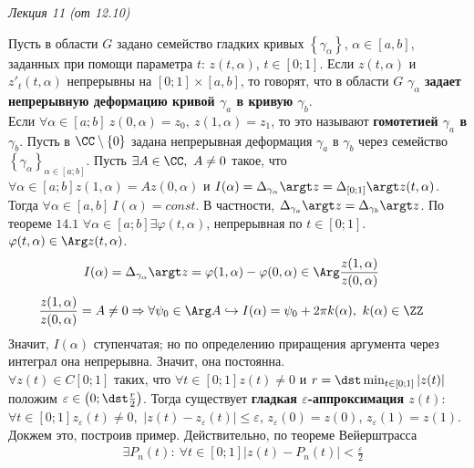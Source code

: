 \begin{flushright}
    \textit{Лекция 11 (от 12.10)}
\end{flushright}
\Def
Пусть в области $G$ задано семейство гладких кривых $\left\{ \gamma_\alpha
\right\}$, $\alpha \in [a,b]$, заданных при помощи параметра $t$: $z(t,
\alpha)$, $t \in [0;1]$. Если $z(t, \alpha)$ и $z'_t(t, \alpha)$ непрерывны на
$[0;1] \times [a,b]$, то говорят, что в области $G$ $\gamma_{\alpha}$
\textbf{задает непрерывную деформацию кривой $\gamma_a$ в кривую $\gamma_b$}.
\\
Если $\forall \alpha \in [a;b] \ z(0, \alpha) = z_0, \ z(1, \alpha) = z_1$, то
это называют \textbf{гомотетией $\gamma_a$ в $\gamma_b$}.
\theorem
Пусть в $\CC \setminus \{0\}$ задана непрерывная деформация $\gamma_a$ в
$\gamma_b$ через семейство $\left\{ \gamma_\alpha \right\}_{\alpha \in [a;b]}$.
Пусть $\exists A \in \CC, \ A \neq 0$ такое, что $\forall \alpha \in [a;b] z(1,
\alpha) = Az(0, \alpha)$ и $I(\alpha) = \Delta_{\gamma_\alpha}\argt z =
\Delta_{[0;1]}\argt z(t, \alpha)$. Тогда $\forall \alpha \in [a,b] \ I(\alpha) =
const$. В частности, $\Delta_{\gamma_a}\argt z = \Delta_{\gamma_b}\argt z$.
\pr
По теореме $14.1$ $\forall \alpha \in [a;b] \exists \varphi(t, \alpha)$,
непрерывная по $t \in [0;1]$. $\varphi(t, \alpha) \in \Arg z (t, \alpha)$.
\begin{align*}
  & I(\alpha) = \Delta_{\gamma_\alpha}\argt z = \varphi(1, \alpha) - \varphi(0, \alpha) \in \Arg \frac{z(1, \alpha)}{z(0, \alpha)}
\end{align*}
\begin{align*}
  & \frac{z(1, \alpha)}{z(0, \alpha)} = A \neq 0 \Rightarrow \forall \psi_0 \in \Arg A \hookrightarrow I(\alpha) = \psi_0+2\pi k(\alpha), \ k(\alpha) \in \ZZ
\end{align*}
Значит, $I(\alpha)$ ступенчатая; но по определению приращения аргумента через
интеграл она непрерывна. Значит, она постоянна.
\\
$\forall z(t) \in C[0;1]$ таких, что $\forall t \in [0;1] z(t) \neq 0$ и $r =
\dst \min_{t \in [0;1]} \left| z(t) \right|$ положим $\varepsilon\in \left( 0;
    \dst \frac{r}{2} \right)$. Тогда существует \textbf{гладкая
  $\varepsilon$-аппроксимация $z(t)$}: $\forall t \in [0;1] z_\varepsilon(t)
\neq 0,$ $\left| z(t) - z_\varepsilon(t) \right| \leq \varepsilon$,
$z_\varepsilon(0) = z(0)$, $z_\varepsilon(1) = z(1)$.
\\
Докжем это, построив пример. Действительно, по теореме Вейерштрасса
\begin{align*}
  & \exists P_n(t): \ \forall t \in [0;1] \left| z(t) - P_n(t) \right| < \frac{\varepsilon}{2}
\end{align*}
